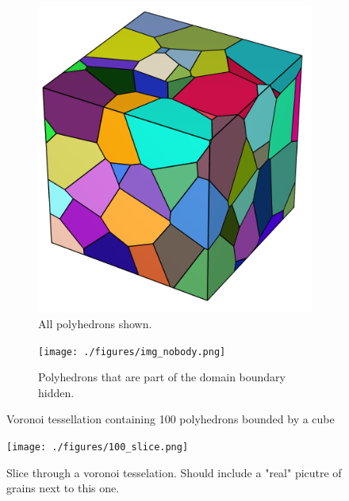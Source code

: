 \documentclass[micro_gen.tex]{subfiles}
\begin{document}
\begin{figure}
\centering
\begin{subfigure}[b]{.5\textwidth}
  \centering
  \includegraphics[width=.5\linewidth]{./figures/img_body.png}
  \caption{All polyhedrons shown.}
  \label{fig:pois_voronoi_a}
\end{subfigure}%
\begin{subfigure}[b]{.5\textwidth}
  \centering
  \texttt{[image: ./figures/img\_nobody.png]}
  \caption{Polyhedrons that are part of the domain boundary hidden.}
  \label{fig:pois_voronoi_b}
\end{subfigure}
\caption{Voronoi tessellation containing 100 polyhedrons bounded by a cube}
\label{fig:pois_voronoi}
\end{figure}


\begin{figure}
\centering
  \texttt{[image: ./figures/100\_slice.png]}
  \caption{Slice through a voronoi tesselation. Should include a "real" picutre of grains next to this one. }
\label{fig:pois_voronoi}
\end{figure}
\end{document}
